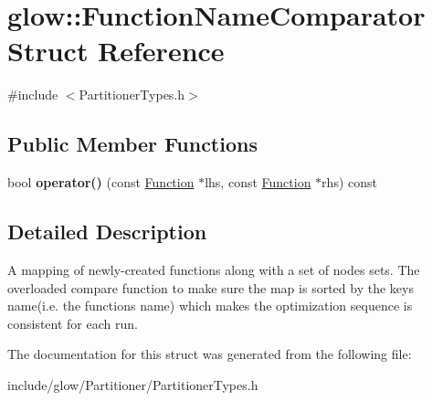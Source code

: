 \hypertarget{structglow_1_1_function_name_comparator}{}\section{glow\+:\+:Function\+Name\+Comparator Struct Reference}
\label{structglow_1_1_function_name_comparator}


{\ttfamily \#include $<$Partitioner\+Types.\+h$>$}

\subsection*{Public Member Functions}
\begin{DoxyCompactItemize}
\item 
\mbox{\label{structglow_1_1_function_name_comparator_a886e9b2701cd5da755b75e95db0697dc}} 
bool {\bfseries operator()} (const \hyperlink{classglow_1_1_function}{Function} $\ast$lhs, const \hyperlink{classglow_1_1_function}{Function} $\ast$rhs) const
\end{DoxyCompactItemize}


\subsection{Detailed Description}
A mapping of newly-\/created functions along with a set of nodes sets. The overloaded compare function to make sure the map is sorted by the key\textquotesingle{}s name(i.\+e. the function\textquotesingle{}s name) which makes the optimization sequence is consistent for each run. 

The documentation for this struct was generated from the following file\+:\begin{DoxyCompactItemize}
\item 
include/glow/\+Partitioner/Partitioner\+Types.\+h\end{DoxyCompactItemize}
